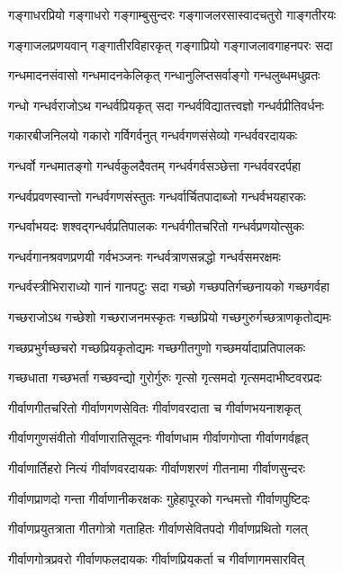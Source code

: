 \twolineshloka
{गङ्गाधरप्रियो गङ्गाधरो गङ्गाम्बुसुन्दरः}%
{गङ्गाजलरसास्वादचतुरो गाङ्गतीरयः}%

\twolineshloka
{गङ्गाजलप्रणयवान् गङ्गातीरविहारकृत्}%
{गङ्गाप्रियो गङ्गाजलावगाहनपरः सदा}%

\twolineshloka
{गन्धमादनसंवासो गन्धमादनकेलिकृत्}%
{गन्धानुलिप्तसर्वाङ्गो गन्धलुब्धमधुव्रतः}%

\twolineshloka
{गन्धो गन्धर्वराजोऽथ गन्धर्वप्रियकृत् सदा}%
{गन्धर्वविद्यातत्त्वज्ञो गन्धर्वप्रीतिवर्धनः}%

\twolineshloka
{गकारबीजनिलयो गकारो गर्विगर्वनुत्}%
{गन्धर्वगणसंसेव्यो गन्धर्ववरदायकः}%

\twolineshloka
{गन्धर्वो गन्धमातङ्गो गन्धर्वकुलदैवतम्}%
{गन्धर्वगर्वसञ्छेत्ता गन्धर्ववरदर्पहा}%

\twolineshloka
{गन्धर्वप्रवणस्वान्तो गन्धर्वगणसंस्तुतः}%
{गन्धर्वार्चितपादाब्जो गन्धर्वभयहारकः}%

\twolineshloka
{गन्धर्वाभयदः शश्वद्गन्धर्वप्रतिपालकः}%
{गन्धर्वगीतचरितो गन्धर्वप्रणयोत्सुकः}%

\twolineshloka
{गन्धर्वगानश्रवणप्रणयी गर्वभञ्जनः}%
{गन्धर्वत्राणसन्नद्धो गन्धर्वसमरक्षमः}%

\twolineshloka
{गन्धर्वस्त्रीभिराराध्यो गानं गानपटुः सदा}%
{गच्छो गच्छपतिर्गच्छनायको गच्छगर्वहा}%

\twolineshloka
{गच्छराजोऽथ गच्छेशो गच्छराजनमस्कृतः}%
{गच्छप्रियो गच्छगुरुर्गच्छत्राणकृतोद्यमः}%

\twolineshloka
{गच्छप्रभुर्गच्छचरो गच्छप्रियकृतोद्यमः}%
{गच्छगीतगुणो गच्छमर्यादाप्रतिपालकः}%

\twolineshloka
{गच्छधाता गच्छभर्ता गच्छवन्द्यो गुरोर्गुरुः}%
{गृत्सो गृत्समदो गृत्समदाभीष्टवरप्रदः}%

\twolineshloka
{गीर्वाणगीतचरितो गीर्वाणगणसेवितः}%
{गीर्वाणवरदाता च गीर्वाणभयनाशकृत्}%

\twolineshloka
{गीर्वाणगुणसंवीतो गीर्वाणारातिसूदनः}%
{गीर्वाणधाम गीर्वाणगोप्ता गीर्वाणगर्वहृत्}%

\twolineshloka
{गीर्वाणार्तिहरो नित्यं गीर्वाणवरदायकः}%
{गीर्वाणशरणं गीतनामा गीर्वाणसुन्दरः}%

\twolineshloka
{गीर्वाणप्राणदो गन्ता गीर्वाणानीकरक्षकः}%
{गुहेहापूरको गन्धमत्तो गीर्वाणपुष्टिदः}%

\twolineshloka
{गीर्वाणप्रयुतत्राता गीतगोत्रो गताहितः}%
{गीर्वाणसेवितपदो गीर्वाणप्रथितो गलत्}%

\twolineshloka
{गीर्वाणगोत्रप्रवरो गीर्वाणफलदायकः}%
{गीर्वाणप्रियकर्ता च गीर्वाणागमसारवित्}%

